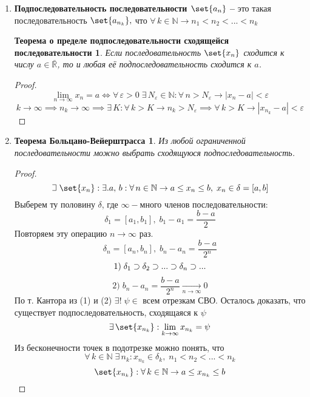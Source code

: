 \documentclass{article}
\theoremstyle{plain}
\def\letus{%
    \mathord{\setbox0=\hbox{$\exists$}%
             \hbox{\kern 0.125\wd0%
                   \vbox to \ht0{%
                      \hrule width 0.75\wd0%
                      \vfill%
                      \hrule width 0.75\wd0}%
                   \vrule height \ht0%
                   \kern 0.125\wd0}%
           }%
}
\begin{document}
\begin{enumerate}
        \item \textbf{Подпоследовательность последовательности $\set{{a_n}}$ -- } это такая последовательность $\set{{a_{n_k}}},$ что $\forall\,k\in\mathbb{N}\rightarrow n_1 < n_2 < ... < n_k$\\
        \newtheorem*{subseqoflimseq*}{Теорема о пределе подпоследовательности сходящейся последовательности}
        \begin{subseqoflimseq*}
        Если последовательность $\set{{x_n}}$ сходится к числу $a\in \bar{\mathbb{R}}$, то и любая её подпоследовательность сходится к $a$.
        \end{subseqoflimseq*}
        \begin{proof}
        $$\lim_{n \to \infty}{x_n} = a \iff \forall\, \varepsilon > 0\; \exists\, N_\varepsilon \in \mathbb{N}: \forall\, n > N_\varepsilon \rightarrow |x_n - a| < \varepsilon$$
        $$k \to \infty \implies n_k \to \infty \implies \exists\, K: \forall\, k > K\rightarrow n_k > N_\varepsilon\implies \forall\, k > K \rightarrow |x_{n_k} - a| < \varepsilon$$
        \end{proof}
        \item \newtheorem*{boltsano*}{Теорема Больцано-Вейерштрасса}
        \begin{boltsano*}
        Из любой ограниченной последовательности можно выбрать сходящуюся подпоследовательность.
        \end{boltsano*}
        \begin{proof}
        $$\letus{}\;\set{{x_n}}: \exists. a,\, b: \forall\,n\in\mathbb{N}\rightarrow a \le x_n \le b,\; x_n \in \delta = [a, b]
        $$
        Выберем ту половину $\delta$, где $\infty-$много членов последовательности:
        $$\delta_1 = [a_1, b_1], \; b_1 - a_1 = \frac{b - a}{2}$$
        Повторяем эту операцию $n \to \infty$ раз.
        $$ \delta_n = [a_n, b_n],\; b_n - a_n = \frac{b - a}{2^n} $$
        $$1)\; \delta_1\; \reflectbox{$\subset$}\;\delta_2 \;\reflectbox{$\subset$}\; ... \;\reflectbox{$\subset$}\; \delta_n\; \reflectbox{$\subset$}\; ...$$
        $$ 2)\; b_n - a_n = \frac{b - a}{2^n} \xrightarrow[n \to \infty]{} 0 $$
        По т. Кантора из (1) и (2) $\exists! \; \psi \in $ всем отрезкам СВО. Осталось доказать, что существует подпоследовательность, сходящаяся к $\psi$
        $$\exists\, \set{{x_{n_k}}}: \lim_{k \to \infty}{x_{n_k}} = \psi$$
        Из бесконечности точек в подотрезке можно понять, что 
        $$ \forall\, k \in \mathbb{N}\; \exists\, n_k: x_{n_k} \in  \delta_k,\; n_1 < n_2 < ... < n_k $$
        $$\set{{x_{n_k}}}: \forall\, k \in \mathbb{N}\rightarrow a \le x_{n_k} \le b$$

\end{proof}
\end{enumerate}
\end{document}
